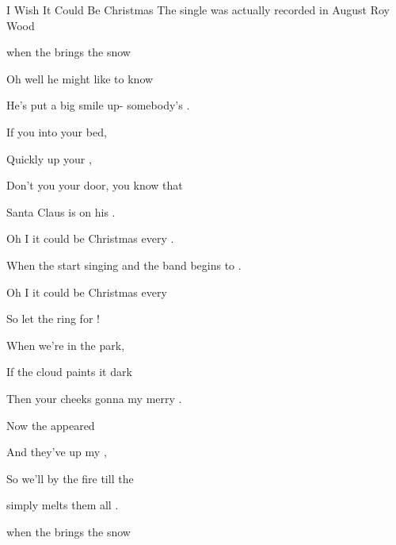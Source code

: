 \begin{SBSong}{I Wish It Could Be Christmas}
    {The single was actually recorded in August}
    {Roy Wood}
  \begin{SBVerse}
     when the  brings the snow

    Oh well he  might like to know

    He's put a  big smile up- somebody's .  

    If you  into your bed,

    Quickly  up your ,

    Don't you  your door, you know that

     Santa Claus is on his . 
  \end{SBVerse}
  \begin{SBChorus}
    Oh  I  it could be Christmas every .

    When the  start singing and the band begins to .  

    Oh I  it could be Christmas every  

    So let the   ring   for  !  
  \end{SBChorus}
  \begin{SBVerse}
    When we're  in the park,

    If the  cloud paints it dark

    Then your  cheeks gonna  my merry .  

    Now the  appeared

    And they've  up my ,

    So we'll  by the fire till the

     simply melts them all . 
  \end{SBVerse}
  \CBPageBrk
  \begin{SBVerse}
     when the  brings the snow


\end{SBVerse}
\end{SBSong}
